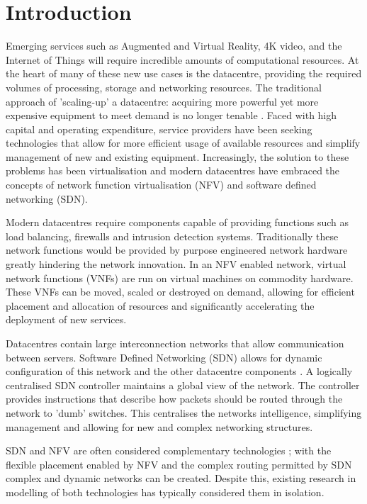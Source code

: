 
\section{Introduction}
\label{sec:introduction}
Emerging services such as Augmented and Virtual Reality, 4K video, and the Internet of Things will require incredible amounts of computational resources\cite{AndrewsBCHLSZ14}. At the heart of many of these new use cases is the datacentre, providing the required volumes of processing, storage and networking resources. The traditional approach of 'scaling-up' a datacentre: acquiring more powerful yet more expensive equipment to meet demand is no longer tenable \cite{VahdatAFMPR10}. Faced with high capital and operating expenditure, service providers have been seeking technologies that allow for more efficient usage of available resources and simplify management of new and existing equipment. Increasingly, the solution to these problems has been virtualisation \cite{HeddeghemLLCPD14} and modern datacentres have embraced the concepts of network function virtualisation (NFV) and software defined networking (SDN).

Modern datacentres require components capable of providing functions such as load balancing, firewalls and intrusion detection systems. Traditionally these network functions would be provided by purpose engineered network hardware greatly hindering the network innovation. In an NFV enabled network, virtual network functions (VNFs) are run on virtual machines on commodity hardware. These VNFs can be moved, scaled or destroyed on demand, allowing for efficient placement and allocation of resources and significantly accelerating the deployment of new services.

Datacentres contain large interconnection networks that allow communication between servers. Software Defined Networking (SDN) allows for dynamic configuration of this network and the other datacentre components \cite{KimF13,HaresW13}. A logically centralised SDN controller maintains a global view of the network. The controller provides instructions that describe how packets should be routed through the network to 'dumb' switches. This centralises the networks intelligence, simplifying management and allowing for new and complex networking structures.

SDN and NFV are often considered complementary technologies \cite{MatiasGTUJ15}; with the flexible placement enabled by NFV and the complex routing permitted by SDN complex and dynamic networks can be created. Despite this, existing research in modelling of both technologies has typically considered them in isolation.

